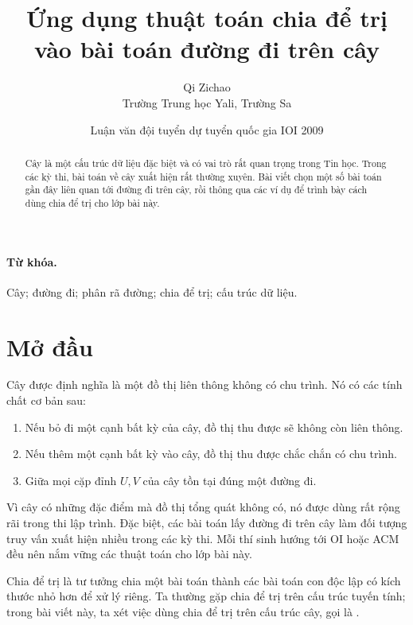\documentclass[11pt]{article}
\title{Ứng dụng thuật toán chia để trị vào bài toán đường đi trên cây}
\author{Qi Zichao\\Trường Trung học Yali, Trường Sa}
\date{Luận văn đội tuyển dự tuyển quốc gia IOI 2009}
\begin{document}
\maketitle


\begin{abstract}
Cây là một cấu trúc dữ liệu đặc biệt và có vai trò rất quan trọng trong Tin
học. Trong các kỳ thi, bài toán về cây xuất hiện rất thường xuyên. Bài viết
chọn một số bài toán gần đây liên quan tới đường đi trên cây, rồi thông qua
các ví dụ để trình bày cách dùng chia để trị cho lớp bài này.
\end{abstract}

\paragraph{Từ khóa.}
Cây; đường đi; phân rã đường; chia để trị; cấu trúc dữ liệu.

\tableofcontents

\section{Mở đầu}

Cây được định nghĩa là một đồ thị liên thông không có chu trình. Nó có các
tính chất cơ bản sau:
\begin{enumerate}
  \item Nếu bỏ đi một cạnh bất kỳ của cây, đồ thị thu được sẽ không còn liên
  thông.
  \item Nếu thêm một cạnh bất kỳ vào cây, đồ thị thu được chắc chắn có chu
  trình.
  \item Giữa mọi cặp đỉnh \(U,V\) của cây tồn tại đúng một đường đi.
\end{enumerate}

Vì cây có những đặc điểm mà đồ thị tổng quát không có, nó được dùng rất rộng
rãi trong thi lập trình. Đặc biệt, các bài toán lấy đường đi trên cây làm đối
tượng truy vấn xuất hiện nhiều trong các kỳ thi. Mỗi thí sinh hướng tới OI
hoặc ACM đều nên nắm vững các thuật toán cho lớp bài này.

Chia để trị là tư tưởng chia một bài toán thành các bài toán con độc lập có
kích thước nhỏ hơn để xử lý riêng. Ta thường gặp chia để trị trên cấu trúc
tuyến tính; trong bài viết này, ta xét việc dùng chia để trị trên cấu trúc cây,
gọi là .
\end{document}
